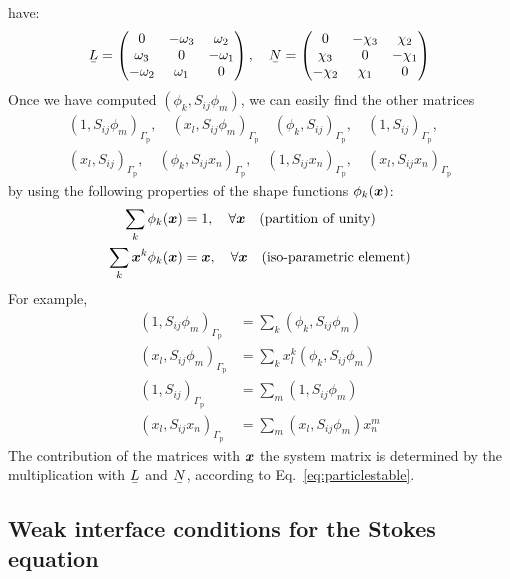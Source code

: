 \begin{enumerate}
have:
\begin{equation}
  \mat L=
  \begin{pmatrix}
    0 & -\omega_3 & \omega_2 \\ 
    \omega_3 & 0 & -\omega_1 \\ 
    -\omega_2 & \omega_1 & 0 
  \end{pmatrix},\quad
  \mat N=
  \begin{pmatrix}
    0 & -\chi_3 & \chi_2 \\ 
    \chi_3 & 0 & -\chi_1 \\ 
    -\chi_2 & \chi_1 & 0 
  \end{pmatrix}
\end{equation}
Once we have computed $(\phi_k,S_{ij}\phi_m)$, we can easily find the other
matrices
\[
\begin{split}
(1,S_{ij}\phi_m)_{\Gamma_\text{p}},\quad
(x_l,S_{ij}\phi_m)_{\Gamma_\text{p}}\quad
(\phi_k,S_{ij})_{\Gamma_\text{p}},\quad
(1,S_{ij})_{\Gamma_\text{p}},\\%
(x_l,S_{ij})_{\Gamma_\text{p}},\quad
(\phi_k,S_{ij}x_n)_{\Gamma_\text{p}},\quad
(1,S_{ij}x_n)_{\Gamma_\text{p}},\quad
(x_l,S_{ij}x_n)_{\Gamma_\text{p}}
\end{split}
\]
by using the following properties of the shape functions $\phi_k(\boldsymbol{x})$:
\begin{align}
   \sum_k\phi_k(\boldsymbol{x})&=1,\quad\forall\boldsymbol{x}\quad\text{(partition of unity)}\\
   \sum_k\boldsymbol{x}^k\phi_k(\boldsymbol{x})&=\boldsymbol{x},\quad\forall\boldsymbol{x}\quad\text{(iso-parametric
element)}
\end{align}
For example,
\begin{align}
  (1,S_{ij}\phi_m)_{\Gamma_\text{p}}&=\sum_k(\phi_k,S_{ij}\phi_m)\\ 
  (x_l,S_{ij}\phi_m)_{\Gamma_\text{p}}&=\sum_k x_l^k(\phi_k,S_{ij}\phi_m)\\
  (1,S_{ij})_{\Gamma_\text{p}}&=\sum_m(1,S_{ij}\phi_m)\\ 
  (x_l,S_{ij}x_n)_{\Gamma_\text{p}}&=\sum_m (x_l,S_{ij}\phi_m)x^m_n
\end{align}
The contribution of the matrices with $\boldsymbol{x}$
the system matrix is determined by the
multiplication with $\mat L$ and $\mat N$, according to
Eq.~\eqref{eq:particlestable}.
\end{enumerate}

\subsection{Weak interface conditions for the Stokes equation}
\label{sec:weakinterfacestokes}

